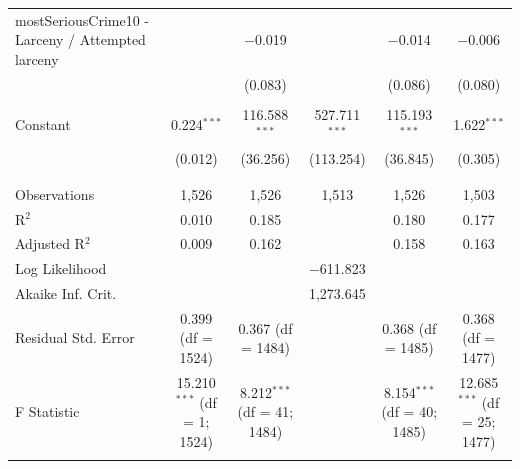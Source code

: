 \documentclass[a4paper,12pt]{article}
\begin{document}
\begin{table}[!htbp]
{\begin{tabular}{@{\extracolsep{5pt}}lccccc}
 mostSeriousCrime10 - Larceny / Attempted larceny &  & $-$0.019 &  & $-$0.014 & $-$0.006 \\ 
  &  & (0.083) &  & (0.086) & (0.080) \\ 
  & & & & & \\ 
  Constant & 0.224$^{***}$ & 116.588$^{***}$ & 527.711$^{***}$ & 115.193$^{***}$ & 1.622$^{***}$ \\ 
  & (0.012) & (36.256) & (113.254) & (36.845) & (0.305) \\ 
  & & & & & \\ 
\hline \\[-1.8ex] 
Observations & 1,526 & 1,526 & 1,513 & 1,526 & 1,503 \\ 
R$^{2}$ & 0.010 & 0.185 &  & 0.180 & 0.177 \\ 
Adjusted R$^{2}$ & 0.009 & 0.162 &  & 0.158 & 0.163 \\ 
Log Likelihood &  &  & $-$611.823 &  &  \\ 
Akaike Inf. Crit. &  &  & 1,273.645 &  &  \\ 
Residual Std. Error & 0.399 (df = 1524) & 0.367 (df = 1484) &  & 0.368 (df = 1485) & 0.368 (df = 1477) \\ 
F Statistic & 15.210$^{***}$ (df = 1; 1524) & 8.212$^{***}$ (df = 41; 1484) &  & 8.154$^{***}$ (df = 40; 1485) & 12.685$^{***}$ (df = 25; 1477) \\ 
\hline 
\hline \\[-1.8ex] 

\end{tabular} }
\end{table} 
\end{document}
